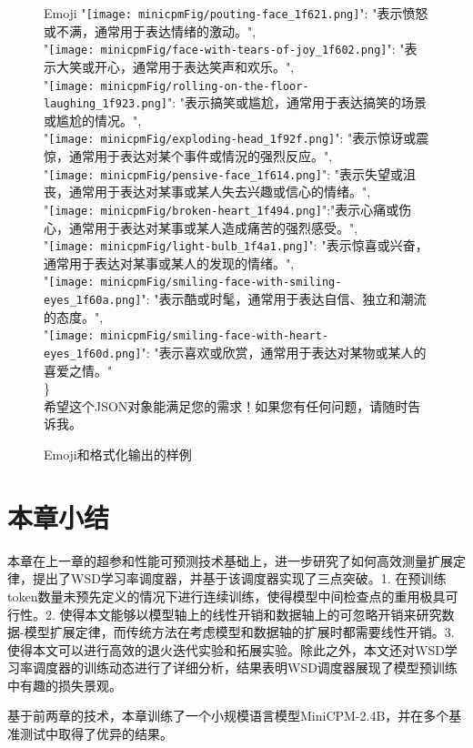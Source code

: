 \begin{figure}[hbp]
{\begin{AIbox}{Emoji}
{{    "\texttt{[image: minicpmFig/pouting-face\_1f621.png]}": "表示愤怒或不满，通常用于表达情绪的激动。", \\
    "\texttt{[image: minicpmFig/face-with-tears-of-joy\_1f602.png]}": "表示大笑或开心，通常用于表达笑声和欢乐。", \\
    "\texttt{[image: minicpmFig/rolling-on-the-floor-laughing\_1f923.png]}": "表示搞笑或尴尬，通常用于表达搞笑的场景或尴尬的情况。", \\
    "\texttt{[image: minicpmFig/exploding-head\_1f92f.png]}": "表示惊讶或震惊，通常用于表达对某个事件或情況的强烈反应。",\\
    "\texttt{[image: minicpmFig/pensive-face\_1f614.png]}": "表示失望或沮丧，通常用于表达对某事或某人失去兴趣或信心的情绪。", \\
    "\texttt{[image: minicpmFig/broken-heart\_1f494.png]}":"表示心痛或伤心，通常用于表达对某事或某人造成痛苦的强烈感受。", \\
    "\texttt{[image: minicpmFig/light-bulb\_1f4a1.png]}": "表示惊喜或兴奋，通常用于表达对某事或某人的发现的情绪。",\\
    "\texttt{[image: minicpmFig/smiling-face-with-smiling-eyes\_1f60a.png]}": "表示酷或时髦，通常用于表达自信、独立和潮流的态度。",\\
    "\texttt{[image: minicpmFig/smiling-face-with-heart-eyes\_1f60d.png]}": "表示喜欢或欣赏，通常用于表达对某物或某人的喜爱之情。"\\
    \} \\
    希望这个JSON对象能满足您的需求！如果您有任何问题，请随时告诉我。}
    }
    \hspace{0.01\linewidth}
    \end{AIbox}
    }
    \caption{Emoji和格式化输出的样例}
    \label{fig:emoji}
    \end{figure}


\section{本章小结}
本章在上一章的超参和性能可预测技术基础上，进一步研究了如何高效测量扩展定律，提出了WSD学习率调度器，并基于该调度器实现了三点突破。1. 在预训练token数量未预先定义的情况下进行连续训练，使得模型中间检查点的重用极具可行性。2. 使得本文能够以模型轴上的线性开销和数据轴上的可忽略开销来研究数据-模型扩展定律，而传统方法在考虑模型和数据轴的扩展时都需要线性开销。3. 使得本文可以进行高效的退火迭代实验和拓展实验。除此之外，本文还对WSD学习率调度器的训练动态进行了详细分析，结果表明WSD调度器展现了模型预训练中有趣的损失景观。

基于前两章的技术，本章训练了一个小规模语言模型MiniCPM-2.4B，并在多个基准测试中取得了优异的结果。